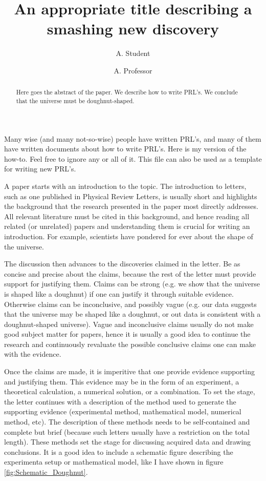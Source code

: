 \documentclass[twocolumn,prl]{revtex4-1}
\begin{document}
\title{An appropriate title describing a smashing new discovery}
\author{A. Student}
\author{A. Professor}
\begin{abstract}
Here goes the abstract of the paper. We describe how to write PRL's. We conclude that the universe must be doughnut-shaped.
\end{abstract}
\maketitle

Many wise (and many not-so-wise) people have written PRL's, and many of them have written documents about how to write PRL's. Here is my version of the how-to. Feel free to ignore any or all of it. This file can also be used as a template for writing new PRL's.

A paper starts with an introduction to the topic. The introduction to letters, such as one published in Physical Review Letters, is usually short and highlights the background that the research presented in the paper most directly addresses. All relevant literature must be cited in this background, and hence reading all related (or unrelated) papers and understanding them is crucial for writing an introduction. For example, scientists have pondered for ever about the shape of the universe\cite{aurich2004can,ellis2003shape,adams2001shape,gomero2000signature,cornish1998can}.

The discussion then advances to the discoveries claimed in the letter. Be as concise and precise about the claims, because the rest of the letter must provide support for justifying them. Claims can be strong (e.g. we show that the universe is shaped like a doughnut) if one can justify it through suitable evidence. Otherwise claims can be inconclusive, and possibly vague (e.g. our data suggests that the universe may be shaped like a doughnut, or out data is consistent with a doughnut-shaped universe). Vague and inconclusive claims usually do not make good subject matter for papers, hence it is usually a good idea to continue the research and continuously revaluate the possible conclusive claims one can make with the evidence.

Once the claims are made, it is imperitive that one provide evidence supporting and justifying them. This evidence may be in the form of an experiment, a theoretical calculation, a numerical solution, or a combination. To set the stage, the letter continues with a description of the method used to generate the supporting evidence (experimental method, mathematical model, numerical method, etc). The description of these methods needs to be self-contained and complete but brief (because such letters usually have a restriction on the total length). These methods set the stage for discussing acquired data and drawing conclusions. It is a good idea to include a schematic figure describing the experimenta setup or mathematical model, like I have shown in figure \ref{fig:Schematic_Doughnut}.
\end{document}
